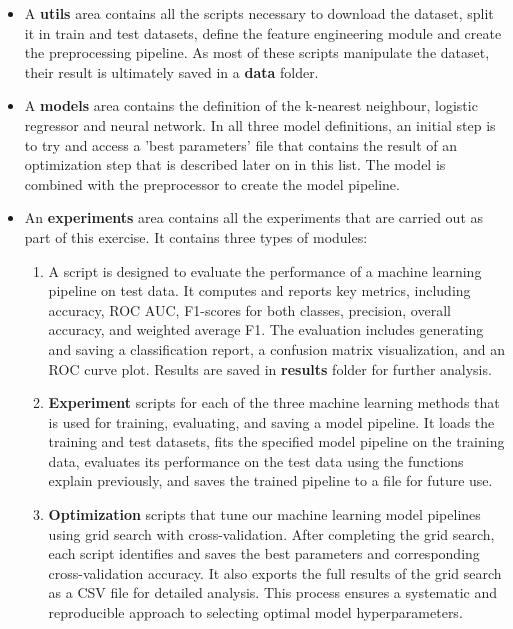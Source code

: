	
	\begin{itemize}
		\item A \textbf{utils} area contains all the scripts necessary to download the dataset, split it in train and test datasets, define the feature engineering module and create the preprocessing pipeline. As most of these scripts manipulate the dataset, their result is ultimately saved in a \textbf{data} folder.
		
		\item A \textbf{models} area contains the definition of the k-nearest neighbour, logistic regressor and neural network. In all three model definitions, an initial step is to try and access a 'best parameters' file that contains the result of an optimization step that is described later on in this list. The model is combined with the preprocessor  to create the model pipeline.
		
		\item An \textbf{experiments} area contains all the experiments that are carried out as part of this exercise. It contains three types of modules:
		
		\begin{enumerate}
			\item A script is designed to evaluate the performance of a machine learning pipeline on test data. It computes and reports key metrics, including accuracy, ROC AUC, F1-scores for both classes, precision, overall accuracy, and weighted average F1. The evaluation includes generating and saving a classification report, a confusion matrix visualization, and an ROC curve plot. Results are saved in \textbf{results} folder for further analysis.
			
			\item \textbf{Experiment} scripts for each of the three machine learning methods that is used for training, evaluating, and saving a model pipeline. It loads the training and test datasets, fits the specified model pipeline on the training data, evaluates its performance on the test data using the functions explain previously, and saves the trained pipeline to a file for future use.
			
			\item \textbf{Optimization} scripts that tune our machine learning model pipelines using grid search with cross-validation. After completing the grid search, each script identifies and saves the best parameters and corresponding cross-validation accuracy. It also exports the full results of the grid search as a CSV file for detailed analysis. This process ensures a systematic and reproducible approach to selecting optimal model hyperparameters.
		\end{enumerate}
	\end{itemize}
	
